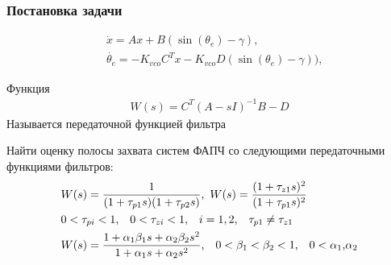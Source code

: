\documentclass{beamer}
\begin{document}
\begin{frame}
\frametitle{Постановка задачи}\vspace{-3mm}
 \begin{equation}
 \begin{aligned}
 &\dot{x} = Ax + B(\operatorname{sin}(\theta_e) - \gamma)\text{,}\\[0.3pt]
 &\dot{\theta_e} = -K_{vco}C^T x -K_{vco}D(\operatorname{sin}(\theta_e) - \gamma))\text{,}
 \end{aligned}
\end{equation}\vspace{-3mm}
\begin{definition}
Функция  
\begin{equation}
 \begin{aligned}
 W(s)=C^T \left(A-sI\right)^{-1}B - D
 \end{aligned}
\end{equation}
Называется передаточной функцией фильтра
\end{definition}
Найти оценку полосы захвата систем ФАПЧ со следующими передаточными функциями фильтров:\vspace{-4mm}
\begin{equation*}
 \begin{aligned}
&W(s) = \frac{1}{(1+\tau_{p1}s)(1+\tau_{p2}s)} \text{,} \enskip
W(s) = \frac{(1+\tau_{z1}s)^2}{(1+\tau_{p1}s)^2}\\
&0 < \tau_{pi} < 1 \text{,} \quad 0 < \tau_{zi} < 1  \text{,} \quad i = 1,2 \text{,} \quad \tau_{p1} \neq \tau_{z1}\\
&W(s) = \frac{1+\alpha_1\beta_1s + \alpha_2\beta_2s^2}{1+\alpha_1s + \alpha_2s^2} \text{,} \quad
0 < \beta_1 < \beta_2 < 1 \text{,}\quad 0 < \alpha_1 \text{,} \alpha_2
 \end{aligned}
\end{equation*}
\end{frame}

\end{document}
